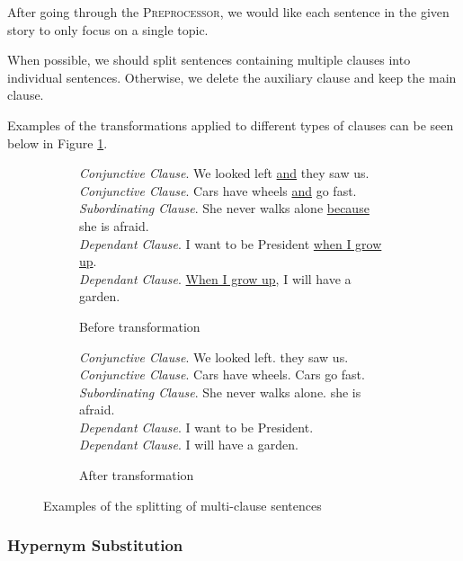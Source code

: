 After going through the \textsc{Preprocessor}, we would like each sentence in the given story to only focus on a single topic.

When possible, we should split sentences containing multiple clauses into individual sentences. Otherwise, we delete the auxiliary clause and keep the main clause.

Examples of the transformations applied to different types of clauses can be seen below in Figure \ref{fig:clause_transformations}.

\begin{figure}[H]
\begin{subfigure}{\textwidth}
\begin{displayquote}
\textit{Conjunctive Clause}. We looked left \underline{and} they saw us.\\
\textit{Conjunctive Clause}. Cars have wheels \underline{and} go fast.\\
\textit{Subordinating Clause}. She never walks alone \underline{because} she is afraid.\\
\textit{Dependant Clause}. I want to be President \underline{when I grow up}.\\
\textit{Dependant Clause}. \underline{When I grow up}, I will have a garden.
\end{displayquote}
\caption{Before transformation}
\vspace{\baselineskip}
\end{subfigure}
\begin{subfigure}{\textwidth}
\begin{displayquote}
\textit{Conjunctive Clause}. We looked left. they saw us.\\
\textit{Conjunctive Clause}. Cars have wheels. Cars go fast.\\
\textit{Subordinating Clause}. She never walks alone. she is afraid.\\
\textit{Dependant Clause}. I want to be President.\\
\textit{Dependant Clause}. I will have a garden.
\end{displayquote}
\caption{After transformation}
\end{subfigure}
\caption{Examples of the splitting of multi-clause sentences}
\label{fig:clause_transformations}
\end{figure}

\subsubsection{Hypernym Substitution}

